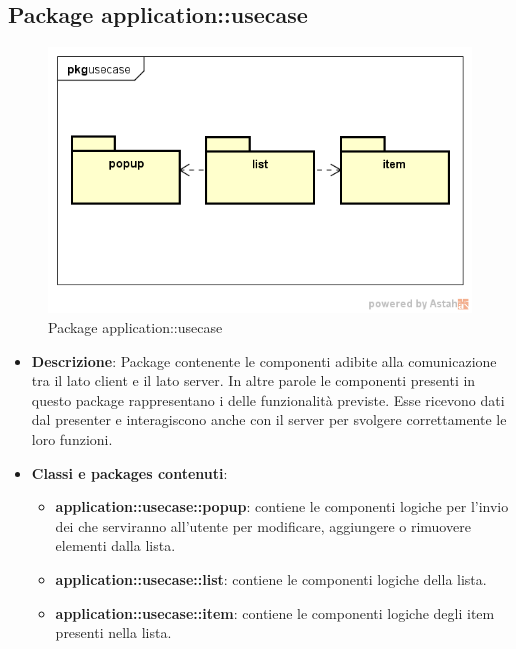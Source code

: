 \subsection{Package application::usecase}
\label{Package application::usecase}
\begin{figure}[H]
	\centering
	\includegraphics[scale=0.6]{Sezioni/Packages/App/pck_usecase.png}
	\caption{Package application::usecase}
\end{figure}

\begin{itemize}
\item \textbf{Descrizione}: Package contenente le componenti adibite alla comunicazione tra il lato client e il lato server. In altre parole le componenti presenti in questo package rappresentano i  delle funzionalità previste. Esse ricevono dati dal presenter e interagiscono anche con il server per svolgere correttamente le loro funzioni.
\item \textbf{Classi e packages contenuti}:
\begin{itemize}
\item \textbf{application::usecase::popup}: contiene le componenti logiche per l'invio dei  che serviranno all'utente per modificare, aggiungere o rimuovere elementi dalla lista.
\item \textbf{application::usecase::list}: contiene le componenti logiche della lista.
\item \textbf{application::usecase::item}: contiene le componenti logiche degli item presenti nella lista.
\end{itemize}
\end{itemize}

